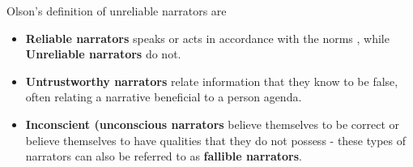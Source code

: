 Olson's definition of unreliable narrators are\cite[p. 96]{Olson}

\begin{itemize}
	\item \textbf{Reliable narrators} speaks or acts in accordance with the norms , while \textbf{Unreliable narrators} do not.
	\item \textbf{Untrustworthy narrators} relate information that they know to be false, often relating a narrative beneficial to a person agenda.
	\item \textbf{Inconscient (unconscious narrators} believe themselves to be correct or believe themselves to have qualities that they do not possess - these types of narrators can also be referred to as \textbf{fallible narrators}.
\end{itemize}